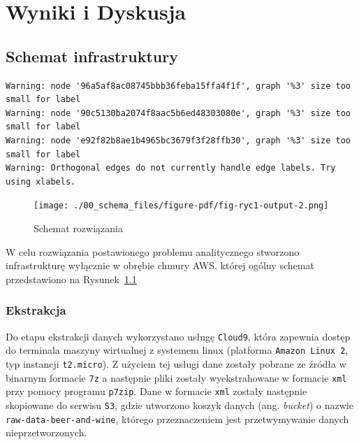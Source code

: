 \documentclass[
  letterpaper,
  DIV=11,
  numbers=noendperiod]{scrreprt}
\begin{document}
\part{Wyniki i Dyskusja}

\hypertarget{schemat-infrastruktury}{%
\chapter{Schemat infrastruktury}\label{schemat-infrastruktury}}

\begin{verbatim}
Warning: node '96a5af8ac08745bbb36feba15ffa4f1f', graph '%3' size too small for label
Warning: node '90c5130ba2074f8aac5b6ed48303080e', graph '%3' size too small for label
Warning: node 'e92f82b8ae1b4965bc3679f3f28ffb30', graph '%3' size too small for label
Warning: Orthogonal edges do not currently handle edge labels. Try using xlabels.
\end{verbatim}

\begin{figure}

{\centering \texttt{[image: ./00\_schema\_files/figure-pdf/fig-ryc1-output-2.png]}

}

\caption{\label{fig-ryc1}Schemat rozwiązania}

\end{figure}

W celu rozwiązania postawionego problemu analitycznego stworzono
infrastrukturę wyłącznie w obrębie chmury AWS, której ogólny schemat
przedstawiono na Rysunek~\ref{fig-ryc1}

\hypertarget{ekstrakcja}{%
\section{Ekstrakcja}\label{ekstrakcja}}

Do etapu ekstrakcji danych wykorzystano usługę \texttt{Cloud9}, która
zapewnia dostęp do terminala maszyny wirtualnej z systemem linux
(platforma \texttt{Amazon\ Linux\ 2}, typ instancji \texttt{t2.micro}).
Z użyciem tej usługi dane zostały pobrane ze źródła w binarnym formacie
\texttt{7z} a następnie pliki zostały wyekstrahowane w formacie
\texttt{xml} przy pomocy programu \texttt{p7zip}. Dane w formacie
\texttt{xml} zostały następnie skopiowane do serwisu \texttt{S3}, gdzie
utworzono koszyk danych (ang. \emph{bucket}) o nazwie
\texttt{raw-data-beer-and-wine}, którego przeznaczeniem jest
przetwymywanie danych nieprzetworzonych.
\end{document}

